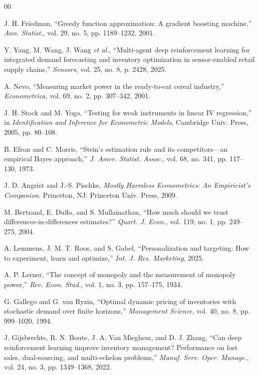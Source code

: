 \documentclass[conference,a4paper]{IEEEtran}
\begin{document}
\begin{thebibliography}{00}

 J. H. Friedman, ``Greedy function approximation: A
gradient boosting machine,'' \emph{Ann. Statist.}, vol. 29, no. 5,
pp. 1189--1232, 2001.

 Y. Yang, M. Wang, J. Wang \emph{et al.}, ``Multi-agent deep
reinforcement learning for integrated demand forecasting and inventory
optimization in sensor-enabled retail supply chains,'' \emph{Sensors}, vol. 25,
no. 8, p. 2428, 2025.

 A. Nevo, ``Measuring market power in the ready-to-eat cereal
industry,'' \emph{Econometrica}, vol. 69, no. 2, pp. 307--342, 2001.

 J. H. Stock and M. Yogo, ``Testing for weak instruments in
linear IV regression,'' in \emph{Identification and Inference for Econometric
Models}, Cambridge Univ. Press, 2005, pp. 80--108.

 B. Efron and C. Morris, ``Stein's estimation rule and its
competitors---an empirical Bayes approach,'' \emph{J. Amer. Statist. Assoc.},
vol. 68, no. 341, pp. 117--130, 1973.

 J. D. Angrist and J.-S. Pischke, \emph{Mostly Harmless
Econometrics: An Empiricist's Companion}. Princeton, NJ: Princeton Univ.
Press, 2009.

 M. Bertrand, E. Duflo, and S. Mullainathan, ``How much
should we trust differences-in-differences estimates?'' \emph{Quart. J. Econ.}, vol. 119, no. 1, pp. 249--275, 2004.

 A. Lemmens, J. M. T. Roos, and S. Gabel,
``Personalization and targeting: How to experiment, learn and optimize,''
\emph{Int. J. Res. Marketing}, 2025.

 A. P. Lerner, ``The concept of monopoly and the
measurement of monopoly power,'' \emph{Rev. Econ. Stud.}, vol. 1,
no. 3, pp. 157--175, 1934.

 G. Gallego and G. van Ryzin, ``Optimal dynamic pricing of
inventories with stochastic demand over finite horizons,'' \emph{Management
Science}, vol. 40, no. 8, pp. 999--1020, 1994.

 J. Gijsbrechts, R. N. Boute, J. A. Van Mieghem, and
D. J. Zhang, ``Can deep reinforcement learning improve inventory management?
Performance on lost sales, dual-sourcing, and multi-echelon problems,''
\emph{Manuf. Serv. Oper. Manage.}, vol. 24, no. 3,
pp. 1349--1368, 2022.


\end{thebibliography}
\end{document}
